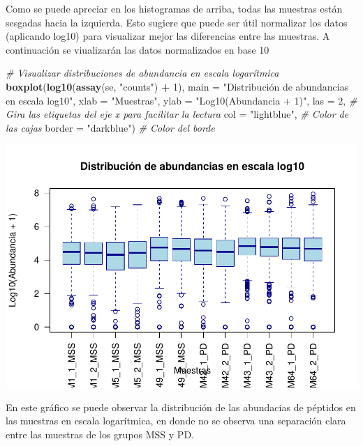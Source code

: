 \documentclass[
]{article}
\newenvironment{Shaded}{\begin{snugshade}}{\end{snugshade}}
\newcommand{\AttributeTok}[1]{\textcolor[rgb]{0.13,0.29,0.53}{#1}}
\newcommand{\CommentTok}[1]{\textcolor[rgb]{0.56,0.35,0.01}{\textit{#1}}}
\newcommand{\DecValTok}[1]{\textcolor[rgb]{0.00,0.00,0.81}{#1}}
\newcommand{\FunctionTok}[1]{\textcolor[rgb]{0.13,0.29,0.53}{\textbf{#1}}}
\newcommand{\NormalTok}[1]{#1}
\newcommand{\SpecialCharTok}[1]{\textcolor[rgb]{0.81,0.36,0.00}{\textbf{#1}}}
\newcommand{\StringTok}[1]{\textcolor[rgb]{0.31,0.60,0.02}{#1}}
\begin{document}
Como se puede apreciar en los histogramas de arriba, todas las muestras
están sesgadas hacia la izquierda. Esto sugiere que puede ser útil
normalizar los datos (aplicando log10) para visualizar mejor las
diferencias entre las muestras. A continuación se viualizarán las datos
normalizados en base 10

\begin{Shaded}
\begin{Highlighting}[]
\CommentTok{\# Visualizar distribuciones de abundancia en escala logarítmica}
\FunctionTok{boxplot}\NormalTok{(}\FunctionTok{log10}\NormalTok{(}\FunctionTok{assay}\NormalTok{(se, }\StringTok{"counts"}\NormalTok{) }\SpecialCharTok{+} \DecValTok{1}\NormalTok{), }
        \AttributeTok{main =} \StringTok{"Distribución de abundancias en escala log10"}\NormalTok{,}
        \AttributeTok{xlab =} \StringTok{"Muestras"}\NormalTok{,}
        \AttributeTok{ylab =} \StringTok{"Log10(Abundancia + 1)"}\NormalTok{,}
        \AttributeTok{las =} \DecValTok{2}\NormalTok{,  }\CommentTok{\# Gira las etiquetas del eje x para facilitar la lectura}
        \AttributeTok{col =} \StringTok{"lightblue"}\NormalTok{,  }\CommentTok{\# Color de las cajas}
        \AttributeTok{border =} \StringTok{"darkblue"}\NormalTok{)  }\CommentTok{\# Color del borde}
\end{Highlighting}
\end{Shaded}

\includegraphics{Manzano-Reche-Gabriel-PEC1_files/figure-latex/unnamed-chunk-11-1.pdf}

En este gráfico se puede observar la distribución de las abundacias de
péptidos en las muestras en escala logarítmica, en donde no se observa
una separación clara entre las muestras de los grupos MSS y PD.
\end{document}
